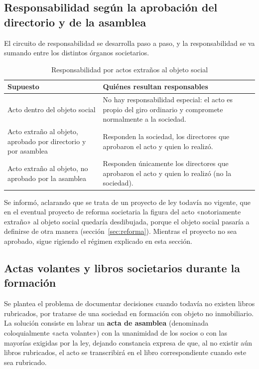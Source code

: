 \documentclass[12pt,oneside]{book}
\begin{document}
\subsection{Responsabilidad según la aprobación del directorio y de la asamblea}

El circuito de responsabilidad se desarrolla paso a paso, y la responsabilidad se va sumando entre los distintos órganos societarios.

\begin{table}[H]
\centering
\caption{Responsabilidad por actos extraños al objeto social}
\renewcommand{\arraystretch}{1.2}
\begin{tabularx}{\textwidth}{>{\raggedright\arraybackslash}p{}X}
\toprule
\textbf{Supuesto} & \textbf{Quiénes resultan responsables} \\
\midrule
Acto dentro del objeto social & No hay responsabilidad especial: el acto es propio del giro ordinario y compromete normalmente a la sociedad. \\
Acto extraño al objeto, aprobado por directorio y por asamblea & Responden la sociedad, los directores que aprobaron el acto y quien lo realizó. \\
Acto extraño al objeto, no aprobado por la asamblea & Responden únicamente los directores que aprobaron el acto y quien lo realizó (no la sociedad). \\
\bottomrule
\end{tabularx}
\end{table}

\begin{note}
Se informó, aclarando que se trata de un proyecto de ley todavía no vigente, que en el eventual proyecto de reforma societaria la figura del acto «notoriamente extraño» al objeto social quedaría desdibujada, porque el objeto social pasaría a definirse de otra manera (sección~\ref{sec:reforma}). Mientras el proyecto no sea aprobado, sigue rigiendo el régimen explicado en esta sección.
\end{note}

\subsection{Actas volantes y libros societarios durante la formación}

Se plantea el problema de documentar decisiones cuando todavía no existen libros rubricados, por tratarse de una sociedad en formación con objeto no inmobiliario. La solución consiste en labrar un \textbf{acta de asamblea} (denominada coloquialmente «acta volante») con la unanimidad de los socios o con las mayorías exigidas por la ley, dejando constancia expresa de que, al no existir aún libros rubricados, el acto se transcribirá en el libro correspondiente cuando este sea rubricado.
\end{document}
